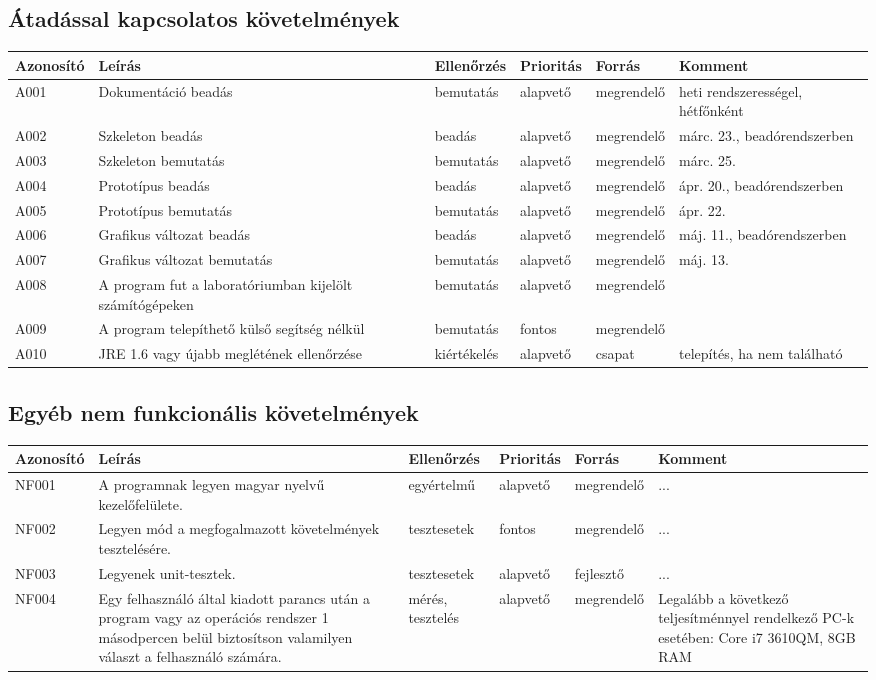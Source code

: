 \subsection{Átadással kapcsolatos követelmények}

\begin{tabularx}{\linewidth}{| l | X | l | l | l | X |}
\hline
\textbf{Azonosító}   & \textbf{Leírás} & \textbf{Ellenőrzés} & \textbf{Prioritás} & \textbf{Forrás} & \textbf{Komment} \tabularnewline
\hline\hline
\endhead
A001 & Dokumentáció beadás & bemutatás & alapvető & megrendelő & heti rendszerességel, hétfőnként \tabularnewline \hline
A002 & Szkeleton beadás & beadás & alapvető & megrendelő & márc. 23., beadórendszerben \tabularnewline \hline
A003 & Szkeleton bemutatás & bemutatás & alapvető & megrendelő & márc. 25. \tabularnewline \hline
A004 & Prototípus beadás & beadás & alapvető & megrendelő & ápr. 20., beadórendszerben \tabularnewline \hline
A005 & Prototípus bemutatás & bemutatás & alapvető & megrendelő & ápr. 22.  \tabularnewline \hline
A006 & Grafikus változat beadás & beadás & alapvető & megrendelő & máj. 11., beadórendszerben  \tabularnewline \hline
A007 & Grafikus változat bemutatás & bemutatás & alapvető & megrendelő & máj. 13. \tabularnewline \hline
A008 & A program fut a laboratóriumban kijelölt számítógépeken & bemutatás & alapvető & megrendelő & \tabularnewline \hline
A009 & A program telepíthető külső segítség nélkül & bemutatás & fontos & megrendelő & \tabularnewline \hline
A010 & JRE 1.6 vagy újabb meglétének ellenőrzése & kiértékelés & alapvető & csapat & telepítés, ha nem található \tabularnewline \hline
\end{tabularx}

\subsection{Egyéb nem funkcionális követelmények}

\begin{tabularx}{\linewidth}{| l | X | l | l | l | X |}
\hline
\textbf{Azonosító}   & \textbf{Leírás} & \textbf{Ellenőrzés} & \textbf{Prioritás} & \textbf{Forrás} & \textbf{Komment} \tabularnewline
\hline\hline
\endhead
NF001 & 
A programnak legyen magyar nyelvű kezelőfelülete.
& egyértelmű & alapvető & megrendelő & ... \tabularnewline \hline
NF002 & 
Legyen mód a megfogalmazott követelmények tesztelésére.
& tesztesetek & fontos & megrendelő & ... \tabularnewline \hline
NF003 & 
Legyenek unit-tesztek.
& tesztesetek & alapvető & fejlesztő & ... \tabularnewline \hline
NF004 & 
Egy felhasználó által kiadott parancs után a program vagy az operációs rendszer 1 másodpercen belül biztosítson valamilyen választ a felhasználó számára.  
& mérés, tesztelés & alapvető & megrendelő & Legalább a következő teljesítménnyel rendelkező PC-k esetében: Core i7 3610QM, 8GB RAM \tabularnewline \hline

	
\end{tabularx}


